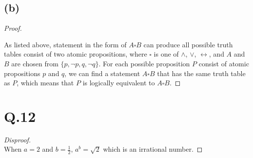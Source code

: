 \documentclass[a4paper,12pt]{article}
\begin{document}
\subsection*{(b)}
\begin{proof}
	$ $\\
	\begin{center}
	\end{center}

	As listed above, statement in the form of $A \square B$ can produce all possible truth tables consist of two atomic propositions, where $\square$ is one of $\wedge$, $\vee$, $\leftrightarrow$, and $A$ and $B$ are chosen from $\{ p, \neg p, q, \neg q \}$.
	For each possible proposition $P$ consist of atomic propositions $p$ and $q$, we can find a statement $A \square B$ that has the same truth table as $P$, which means that $P$ is logically equivalent to $A \square B$.
\end{proof}

\section*{Q.12}

\begin{proof}[Disproof]
	$ $\\
	When $a = 2$ and $b = \frac{1}{2}$, $a^b = \sqrt{2}$ which is an irrational number.
\end{proof}
\end{document}
